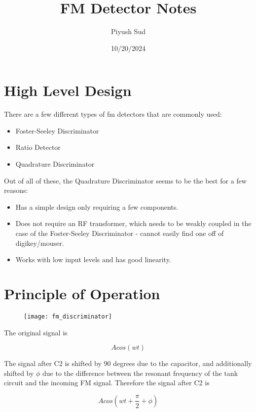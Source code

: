 \documentclass[12pt, letterpaper]{article}
\title{FM Detector Notes}
\author{Piyush Sud}
\date{10/20/2024}
\begin{document}
\maketitle

\pagebreak

\section{High Level Design}

There are a few different types of fm detectors that are commonly used:

\begin{itemize}
    \item Foster-Seeley Discriminator
    \item Ratio Detector
    \item Quadrature Discriminator
\end{itemize}

\noindent Out of all of these, the Quadrature Discriminator seems to be the best for a few reasons:

\begin{itemize}
    \item Has a simple design only requiring a few components.
    \item Does not require an RF transformer, which needs to be weakly coupled in the case of the Foster-Seeley Discriminator - cannot easily find one off of digikey/mouser.
    \item Works with low input levels and has good linearity.
\end{itemize}

\section{Principle of Operation}

\begin{figure}[h]
    \texttt{[image: fm\_discriminator]}
\end{figure}

The original signal is 

\[Acos(wt)\] 

The signal after C2 is shifted by 90 degrees due to the capacitor, and additionally shifted by \(\phi\) due to the difference between the resonant frequency of the tank circuit and the incoming FM signal. Therefore the signal after C2 is 

\[Acos(wt + \frac{\pi}{2} + \phi)\] 
\end{document}
